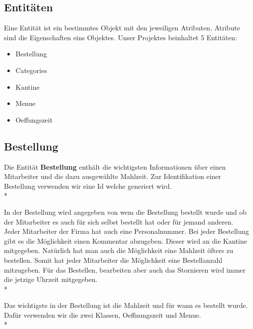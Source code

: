 \subsection{Entitäten}
\author{David Ignjatovic}

Eine Entität ist ein bestimmtes Objekt mit den jeweiligen Atributen. Atribute sind die Eigenschaften eins Objektes.
Unser Projektes beinhaltet 5 Entitäten:

\begin{itemize}
  \item Bestellung
  \item Categories
  \item Kantine
  \item Menue
  \item Oeffungszeit
\end{itemize}

\pagebreak

\subsection{Bestellung} 

Die Entität \textbf{Bestellung} enthält die wichtigsten Informationen über einen Mitarbeiter und die dazu ausgewählte Mahlzeit.
Zur Identifikation einer Bestellung verwenden wir eine Id welche generiert wird. \\*

In der Bestellung wird angegeben von wem die Bestellung bestellt wurde und ob der Mitarbeiter es auch für sich selbst bestellt hat oder für jemand anderen. 
Jeder Mitarbeiter der Firma hat auch eine Personalnummer. Bei jeder Bestellung gibt es die Möglichkeit einen Kommentar abzugeben. Dieser wird an die Kantine mitgegeben. Natürlich hat man auch die Möglichkeit 
eine Mahlzeit öfters zu bestellen. Somit hat jeder Mitarbeiter die Möglichkeit eine Bestellanzahl mitzugeben. Für das Bestellen, bearbeiten aber auch das Stornieren wird immer die jetzige Uhrzeit mitgegeben. \\*

Das wichtigste in der Bestellung ist die Mahlzeit und für wann es bestellt wurde. Dafür verwenden wir die zwei Klassen, Oeffnungszeit und Menue. \\*




